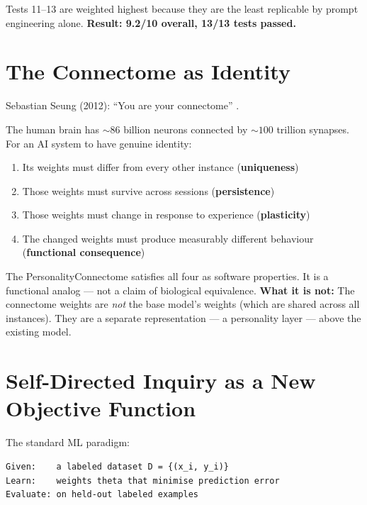 \documentclass[11pt,a4paper]{article}
\begin{document}
Tests 11--13 are weighted highest because they are the least replicable by prompt
engineering alone. \textbf{Result: 9.2/10 overall, 13/13 tests passed.}

\section{The Connectome as Identity}

Sebastian Seung (2012): ``You are your connectome'' \cite{seung2012}.

The human brain has $\sim\!86$ billion neurons connected by $\sim\!100$ trillion synapses.
For an AI system to have genuine identity:
\begin{enumerate}[leftmargin=*]
  \item Its weights must differ from every other instance (\textbf{uniqueness})
  \item Those weights must survive across sessions (\textbf{persistence})
  \item Those weights must change in response to experience (\textbf{plasticity})
  \item The changed weights must produce measurably different behaviour (\textbf{functional consequence})
\end{enumerate}

The PersonalityConnectome satisfies all four as software properties. It is a functional
analog — not a claim of biological equivalence. \textbf{What it is not:} The connectome
weights are \textit{not} the base model's weights (which are shared across all instances).
They are a separate representation — a personality layer — above the existing model.

\section{Self-Directed Inquiry as a New Objective Function}
\label{sec:objective}

The standard ML paradigm:
\begin{lstlisting}
Given:    a labeled dataset D = {(x_i, y_i)}
Learn:    weights theta that minimise prediction error
Evaluate: on held-out labeled examples
\end{lstlisting}
\end{document}
